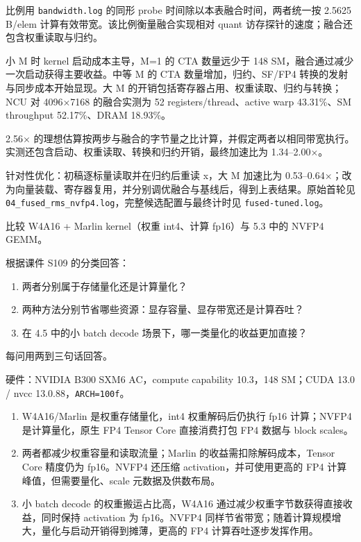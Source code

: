 \documentclass[11pt,a4paper,fontset=fandol]{ctexart}
\begin{document}
\begin{answer}
比例用 \texttt{bandwidth.\allowbreak{}log} 的同形 probe
时间除以本表融合时间，两者统一按 2.5625 B/elem
计算有效带宽。该比例衡量融合实现相对 quant
访存探针的速度；融合还包含权重读取与归约。

小 M 时 kernel 启动成本主导，M=1 的 CTA 数量远少于 148
SM，融合通过减少一次启动获得主要收益。中等 M 的 CTA
数量增加，归约、SF/FP4 转换的发射与同步成本开始显现。大 M
的开销包括寄存器占用、权重读取、归约与转换；NCU 对 4096×7168
的融合实测为 52 registers/thread、active warp 43.31\%、SM throughput
52.17\%、DRAM 18.93\%。

2.56×
的理想估算按两步与融合的字节量之比计算，并假定两者以相同带宽执行。实测还包含启动、权重读取、转换和归约开销，最终加速比为
1.34--2.00×。

针对性优化：初稿逐标量读取并在归约后重读 x，大 M 加速比为
0.53--0.64×；改为向量装载、寄存器复用，并分别调优融合与基线后，得到上表结果。原始首轮见
\texttt{04\_\allowbreak{}fused\_\allowbreak{}rms\_\allowbreak{}nvfp4.\allowbreak{}log}，完整候选配置与最终计时见
\texttt{fused-\allowbreak{}tuned.\allowbreak{}log}。

\end{answer}


比较 W4A16 + Marlin kernel（权重 int4、计算 fp16）与 5.3 中的 NVFP4
GEMM。

根据课件 S109 的分类回答：

\begin{enumerate}
\def\labelenumi{(\alph{enumi})}
\item
  两者分别属于存储量化还是计算量化？
\item
  两种方法分别节省哪些资源：显存容量、显存带宽还是计算吞吐？
\item
  在 4.5 中的小 batch decode 场景下，哪一类量化的收益更加直接？
\end{enumerate}

每问用两到三句话回答。

\begin{answer}

硬件：NVIDIA B300 SXM6 AC，compute capability 10.3，148 SM；CUDA 13.0 /
nvcc 13.0.88，\texttt{ARCH=\allowbreak{}100f}。

\begin{enumerate}
\def\labelenumi{(\alph{enumi})}
\item
  W4A16/Marlin 是权重存储量化，int4 权重解码后仍执行 fp16 计算；NVFP4
  是计算量化，原生 FP4 Tensor Core 直接消费打包 FP4 数据与 block
  scales。
\item
  两者都减少权重容量和读取流量；Marlin 的收益需扣除解码成本，Tensor Core
  精度仍为 fp16。NVFP4 还压缩 activation，并可使用更高的 FP4
  计算峰值，但需要量化、scale 元数据及供数布局。
\item
  小 batch decode 的权重搬运占比高，W4A16
  通过减少权重字节数获得直接收益，同时保持 activation 为 fp16。NVFP4
  同样节省带宽；随着计算规模增大，量化与启动开销得到摊薄，更高的 FP4
  计算吞吐逐步发挥作用。
\end{enumerate}

\end{answer}
\end{document}
